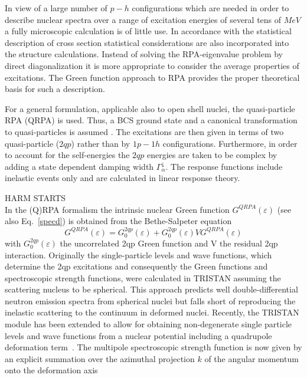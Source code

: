 \documentclass[twocolumn,amsmath,amssymb,10pt,groupedaddress,a4paper]{revtex4}
\begin{document}
In view of a large number of $p-h$ configurations which are needed
in order to describe nuclear spectra over a range of excitation energies
of several tens of $MeV$ a fully microscopic calculation is of little
use. In accordance with the statistical description of cross section
statistical considerations are also incorporated into the structure
calculations. Instead of solving the RPA-eigenvalue problem
by direct diagonalization it is more appropriate to consider the average
properties of excitations. The Green function approach to RPA
\cite{Wal,LW92} provides the proper theoretical basis for such a
description.

For a general formulation, applicable also to open shell nuclei, the
quasi-particle RPA (QRPA) is used. Thus, a BCS ground
state and a canonical transformation to quasi-particles is assumed
\cite{RS}. The excitations are then given in terms of two quasi-particle
($2qp$) rather than by $1p-1h$ configurations. Furthermore, in order
to account for the self-energies the $2qp$ energies are taken to
be complex by adding a state dependent damping width $\Gamma_{\alpha}^{\downarrow}$.
The response functions include inelastic events only and are calculated
in linear response theory.

HARM STARTS\\
In the (Q)RPA formalism the intrinsic nuclear Green function $G^{QRPA}(\varepsilon)$ (see also Eq.~\ref{specd}) is obtained from the Bethe-Salpeter equation
\begin{equation}
G^{QRPA}(\varepsilon) = G_{0}^{2qp}(\varepsilon)+ G_{0}^{2qp}(\varepsilon)VG^{QRPA}(\varepsilon)\end{equation}
with  $G_{0}^{2qp}(\varepsilon)$ the uncorrelated 2qp Green function and V the residual 2qp interaction.
Originally the single-particle levels and wave functions, which determine the 2qp excitations and
consequently the Green functions and spectroscopic strength functions,
were calculated in TRISTAN assuming the scattering nucleus to be spherical.
This approach predicts
well double-differential neutron emission spectra from spherical nuclei but
falls short of reproducing the inelastic scattering to the continuum in deformed nuclei.
Recently, the TRISTAN module has been extended to allow for obtaining non-degenerate
single particle levels and wave functions from a nuclear potential including a quadrupole deformation term~\cite{Wienke:07}.
The multipole spectroscopic strength function is now given by an explicit summation over the azimuthal projection $k$ of the angular momentum onto the deformation axis
\end{document}
